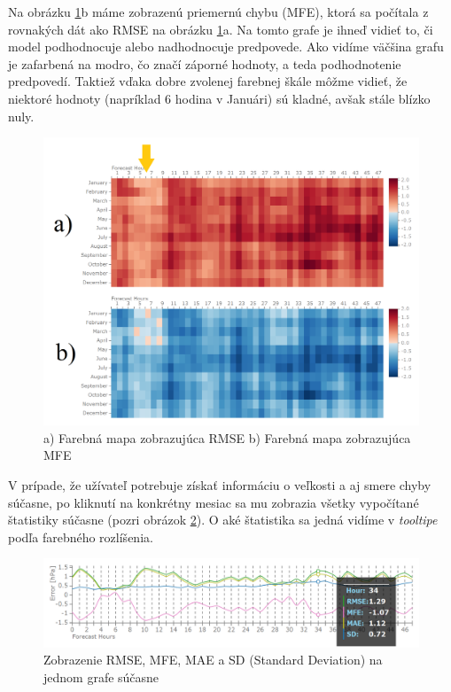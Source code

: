 Na obrázku \ref{fig:overview}b máme zobrazenú priemernú chybu (MFE), ktorá sa počítala z rovnakých dát ako RMSE na obrázku \ref{fig:overview}a. Na tomto grafe je ihneď vidieť to, či model podhodnocuje alebo nadhodnocuje predpovede. Ako vidíme väčšina grafu je zafarbená na modro, čo značí záporné hodnoty, a teda podhodnotenie predpovedí. Taktiež vďaka dobre zvolenej farebnej škále môžme vidieť, že niektoré hodnoty (napríklad 6 hodina v Januári) sú kladné, avšak stále blízko nuly.

\begin{figure}
	\centering
	\includegraphics[width = 5in]{overview}
	\caption{a) Farebná mapa zobrazujúca RMSE b) Farebná mapa zobrazujúca MFE}
	\label{fig:overview} 
\end{figure}

V prípade, že užívateľ potrebuje získať informáciu o veľkosti a aj smere chyby súčasne, po kliknutí na konkrétny mesiac sa mu zobrazia všetky vypočítané štatistiky súčasne (pozri obrázok \ref{fig:detail}). O aké štatistika sa jedná vidíme v \textit{tooltipe} podľa farebného rozlíšenia.

\begin{figure}
	\centering
	\includegraphics[width = 6.5in]{detail}
	\caption{Zobrazenie RMSE, MFE, MAE a SD (Standard Deviation) na jednom grafe súčasne}
	\label{fig:detail} 
\end{figure}


